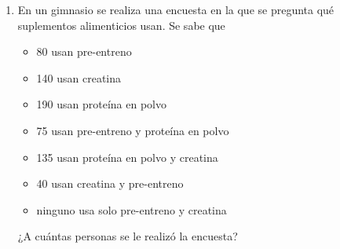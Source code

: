 \documentclass[11pt, twoside]{memoir}
\begin{document}
\begin{enumerate}
    \item En un gimnasio se realiza una encuesta en la que se pregunta qué suplementos alimenticios usan. 
        Se sabe que
        \begin{multicols}{2}
        \begin{itemize}[label=\(\bullet\)]
            \item 80 usan pre-entreno
            \item 140 usan creatina
            \item 190 usan proteína en polvo
            \item 75 usan pre-entreno y proteína en polvo
            \item 135 usan proteína en polvo y creatina
            \item 40 usan creatina y pre-entreno
            \item ninguno usa solo pre-entreno y creatina
        \end{itemize}
    \end{multicols}
    ¿A cuántas personas se le realizó la encuesta?

\end{enumerate}
\end{document}
